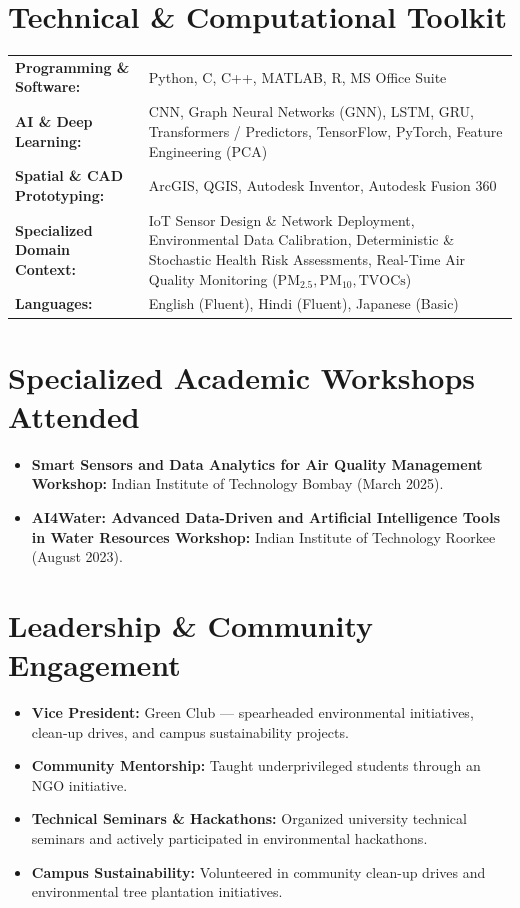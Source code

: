 \documentclass[10pt,a4paper]{article}
\begin{document}
\section*{Technical \& Computational Toolkit}
\begin{tabularx}{\textwidth}{@{}p{}X@{}}
    \textbf{Programming \& Software:} & Python, C, C++, MATLAB, R, MS Office Suite \\
    \textbf{AI \& Deep Learning:} & CNN, Graph Neural Networks (GNN), LSTM, GRU, Transformers / Predictors, TensorFlow, PyTorch, Feature Engineering (PCA) \\
    \textbf{Spatial \& CAD Prototyping:} & ArcGIS, QGIS, Autodesk Inventor, Autodesk Fusion 360 \\
    \textbf{Specialized Domain Context:} & IoT Sensor Design \& Network Deployment, Environmental Data Calibration, Deterministic \& Stochastic Health Risk Assessments, Real-Time Air Quality Monitoring ($\text{PM}_{2.5}, \text{PM}_{10}, \text{TVOCs}$) \\
    \textbf{Languages:} & English (Fluent), Hindi (Fluent), Japanese (Basic)
\end{tabularx}

\section*{Specialized Academic Workshops Attended}
\begin{itemize}
    \item \textbf{Smart Sensors and Data Analytics for Air Quality Management Workshop:} Indian Institute of Technology Bombay (March 2025).
    \item \textbf{AI4Water: Advanced Data-Driven and Artificial Intelligence Tools in Water Resources Workshop:} Indian Institute of Technology Roorkee (August 2023).
\end{itemize}

\section*{Leadership \& Community Engagement}
\begin{itemize}
    \item \textbf{Vice President:} Green Club --- spearheaded environmental initiatives, clean-up drives, and campus sustainability projects.
    \item \textbf{Community Mentorship:} Taught underprivileged students through an NGO initiative.
    \item \textbf{Technical Seminars \& Hackathons:} Organized university technical seminars and actively participated in environmental hackathons.
    \item \textbf{Campus Sustainability:} Volunteered in community clean-up drives and environmental tree plantation initiatives.
\end{itemize}
\end{document}
